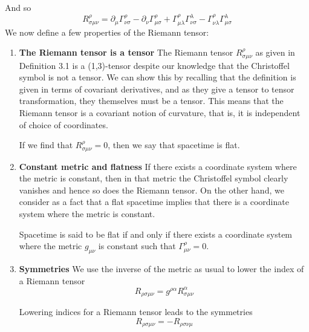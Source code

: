 \documentclass{article}
\begin{document}
 		And so
 		\begin{equation}
 			\label{eq:CurvatureTensor}
 			\boxed{R^\rho_{\sigma\mu\nu} =  \partial_\mu \Gamma_{\nu\sigma}^\rho - \partial_\nu \Gamma_{\mu\sigma}^\rho + \Gamma_{\mu\lambda}^\rho \Gamma_{\nu\sigma}^\lambda - \Gamma_{\nu\lambda}^\rho \Gamma_{\mu\sigma}^\lambda}
 		\end{equation}
 		We now define a few properties of the Riemann tensor:
 		\begin{enumerate}
 			\item \textbf{The Riemann tensor is a tensor}
 				\subitem 
 				The Riemann tensor $R^\rho_{\sigma\mu\nu}$ as given in Definition 3.1 is a (1,3)-tensor despite our knowledge that the Christoffel symbol is not a tensor. We can show this by recalling that the definition is given in terms of covariant derivatives, and as they give a tensor to tensor transformation, they themselves must be a tensor. This means that the Riemann tensor is a covariant notion of curvature, that is, it is independent of choice of coordinates.
 				\begin{thm}
 					If we find that $R^\rho_{\sigma\mu\nu} = 0$, then we say that spacetime is flat.
 				\end{thm}
 			\item \textbf{Constant metric and flatness}
 				\subitem
 				If there exists a coordinate system where the metric is constant, then in that metric the Christoffel symbol clearly vanishes and hence so does the Riemann tensor. On the other hand, we consider as a fact that a flat spacetime implies that there is a coordinate system where the metric is constant.
 				\begin{thm}
 					Spacetime is said to be flat if and only if there exists a coordinate system where the metric $g_{\mu\nu}$ is constant such that $\Gamma^\rho_{\mu\nu} = 0$.
 				\end{thm}
 			\item \textbf{Symmetries}
 				\subitem 
 				We use the inverse of the metric as usual to lower the index of a Riemann tensor
 				\begin{equation}
 					\label{eq:RiemannLower}
 					R_{\rho\sigma\mu\nu} = g^{\rho\alpha} R^\alpha_{\sigma\mu\nu}
 				\end{equation}
 				\begin{thm}
 					Lowering indices for a Riemann tensor leads to the symmetries
 					\begin{equation}
 						\label{eq:RiemannSymmetry}
 						\boxed{R_{\rho\sigma\mu\nu} = -R_{\rho\sigma\nu\mu}}

\end{equation}
\end{thm}
\end{enumerate}
\end{document}

